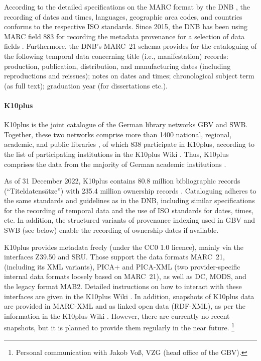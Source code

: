 According to the detailed specifications on the \gls{MARC} format by the DNB
\autocite{DNB_MARC21,DNB_MARCXML}, the recording of dates and times, languages,
geographic area codes, and countries conforms to the respective \gls{ISO} standards.
Since 2015, the DNB has been using \gls{MARC} field 883
for recording the metadata provenance for a selection of data fields
\autocite{DNBwiki_MARC_883}.
Furthermore, the DNB's MARC~21 schema provides for the cataloguing of the following temporal data concerning
title (i.e., manifestation) records: production, publication, distribution, and manufacturing dates
(including reproductions and reissues); notes on dates and times;
chronological subject term (as full text); graduation year (for dissertations etc.).

\paragraph{K10plus}

%
%
\gls{K10plus} is the joint catalogue of the German library networks \gls{GBV} and \gls{SWB}.
Together, these two networks comprise more than 1400 national, regional,
academic, and public libraries \autocite{BSZGBV,GBV_VZG},
of which 838 participate in K10plus, according to the list of participating institutions
in the K10plus Wiki \autocite{K10plusWiki}. Thus, K10plus comprises the data from
the majority of German academic institutions \autocite[cf.][]{BSZ_K10plus}.

As of 31 December 2022, K10plus contains 80.8 million bibliographic records (\enquote{Titeldatensätze})
with 235.4 million ownership records \autocite{GBV_K10plus_Statistik}.
Cataloguing adheres to the same standards and guidelines as in the DNB,
including similar specifications for the recording of temporal data and the use of ISO standards for dates, times, etc.
In addition, the structured variants of provenance indexing used in \gls{GBV} and \gls{SWB}
(see below) enable the recording of ownership dates if available.

K10plus provides metadata freely (under the CC0 1.0 licence),
mainly via the interfaces \gls{Z39.50} and \gls{SRU}.
Those support the data formats \gls{MARC}~21, (including its XML variants),
PICA+ and PICA-XML (two provider-specific internal data formats loosely based on MARC~21),
as well as \gls{DC}, \gls{MODS}, and the legacy format \gls{MAB}2.
Detailed instructions on how to interact with these interfaces
are given in the K10plus Wiki \autocite{K10plusWiki}.
In addition, snapshots of K10plus data are provided
in \gls{MARC}-XML and as linked open data (\gls{RDF}-XML), as per the information
in the K10plus Wiki \autocite{K10plusWikiOD}.
However, there are currently no recent snapshots,
but it is planned to provide them regularly in the near future.%
\footnote{Personal communication with Jakob Voß, VZG (head office of the \gls{GBV}).}

